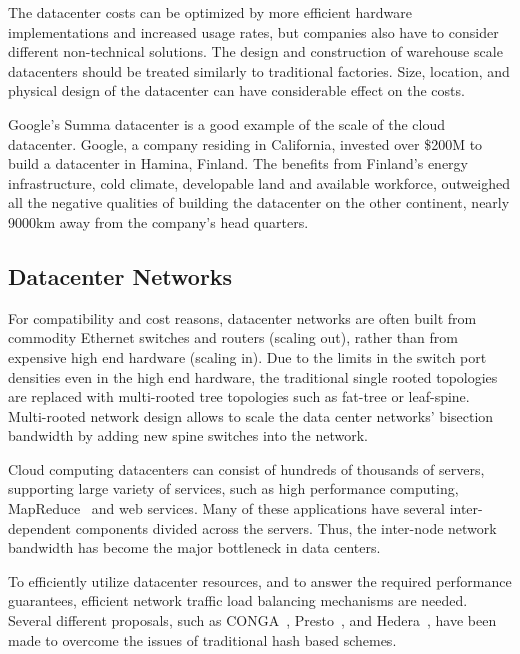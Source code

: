 The datacenter costs can be optimized by more efficient hardware implementations and increased usage rates, but companies also have to consider different non-technical solutions. The design and construction of warehouse scale datacenters should be treated similarly to traditional factories. Size, location, and physical design of the datacenter can have considerable effect on the costs.~\cite{Hoelzle:2009:DCI}

Google's Summa datacenter is a good example of the scale of the cloud datacenter. Google, a company residing in California, invested over \$200M to build a datacenter in Hamina, Finland. The benefits from Finland's energy infrastructure, cold climate, developable land and available workforce, outweighed all the negative qualities of building the datacenter on the other continent, nearly 9000km away from the company's head quarters.~\cite{Google:2016:Summa}

\subsection{Datacenter Networks}
For compatibility and cost reasons, datacenter networks are often built from commodity Ethernet switches and routers (scaling out), rather than from expensive high end hardware (scaling in). Due to the limits in the switch port densities even in the high end hardware, the traditional single rooted topologies are replaced with multi-rooted tree topologies such as fat-tree or leaf-spine. Multi-rooted network design allows to scale the data center networks' bisection bandwidth by adding new spine switches into the network.~\cite{Al-Fares:2010:SO, Al-Fares:2008:SCD}

Cloud computing datacenters can consist of hundreds of thousands of servers, supporting large variety of services, such as high performance computing, MapReduce~\cite{Dean:2008:MR} and web services. Many of these applications have several inter-dependent components divided across the servers. Thus, the inter-node network bandwidth has become the major bottleneck in data centers.~\cite{Al-Fares:2008:SCD}

To efficiently utilize datacenter resources, and to answer the required performance guarantees, efficient network traffic load balancing mechanisms are needed. Several different proposals, such as CONGA~\cite{Alizadeh:2014:Conga},  Presto~\cite{He:2015:Presto}, and Hedera~\cite{Al-Fares:2010:Hedera}, have been made to overcome the issues of traditional hash based schemes.

